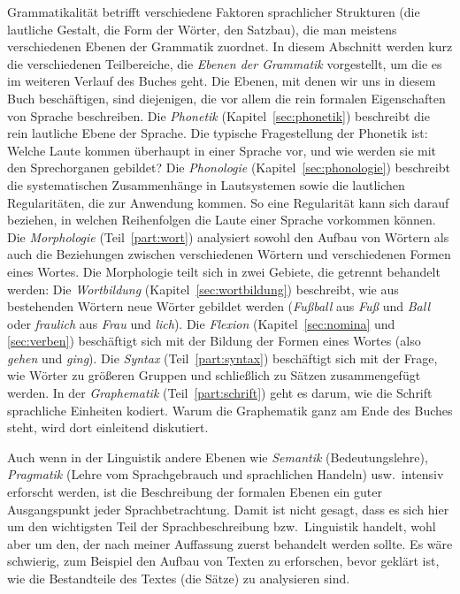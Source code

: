\label{sec:grebenen}


Grammatikalität betrifft verschiedene Faktoren sprachlicher Strukturen (\zB die lautliche Gestalt, die Form der Wörter, den Satzbau), die man meistens verschiedenen Ebenen der Grammatik zuordnet.
In diesem Abschnitt werden kurz die verschiedenen Teilbereiche, die \textit{Ebenen der Grammatik} vorgestellt, um die es im weiteren Verlauf des Buches geht.
Die Ebenen, mit denen wir uns in diesem Buch beschäftigen, sind diejenigen, die vor allem die rein formalen Eigenschaften von Sprache beschreiben.
Die \textit{Phonetik} (Kapitel~\ref{sec:phonetik}) beschreibt die rein lautliche Ebene der Sprache.
Die typische Fragestellung der Phonetik ist:
Welche Laute kommen überhaupt in einer Sprache vor, und wie werden sie mit den Sprechorganen gebildet?
Die \textit{Phonologie} (Kapitel~\ref{sec:phonologie}) beschreibt die systematischen Zusammenhänge in Lautsystemen sowie die lautlichen Regularitäten, die zur Anwendung kommen.
So eine Regularität kann sich \zB darauf beziehen, in welchen Reihenfolgen die Laute einer Sprache vorkommen können.
Die \textit{Morphologie} (Teil~\ref{part:wort}) analysiert sowohl den Aufbau von Wörtern als auch die Beziehungen zwischen verschiedenen Wörtern und verschiedenen Formen eines Wortes.
Die Morphologie teilt sich in zwei Gebiete, die getrennt behandelt werden:
Die \textit{Wortbildung} (Kapitel~\ref{sec:wortbildung}) beschreibt, wie aus bestehenden Wörtern neue Wörter gebildet werden (\zB \textit{Fußball} aus \textit{Fuß} und \textit{Ball} oder \textit{fraulich} aus \textit{Frau} und \textit{lich}).
Die \textit{Flexion} (Kapitel~\ref{sec:nomina} und \ref{sec:verben}) beschäftigt sich mit der Bildung der Formen eines Wortes (also \zB \textit{gehen} und \textit{ging}). 
Die \textit{Syntax} (Teil~\ref{part:syntax}) beschäftigt sich mit der Frage, wie Wörter zu größeren Gruppen und schließlich zu Sätzen zusammengefügt werden.
In der \textit{Graphematik} (Teil~\ref{part:schrift}) geht es darum, wie die Schrift sprachliche Einheiten kodiert.
Warum die Graphematik ganz am Ende des Buches steht, wird dort einleitend diskutiert.

Auch wenn in der Linguistik andere Ebenen wie \textit{Semantik} (Bedeutungslehre), \textit{Pragmatik} (Lehre vom Sprachgebrauch und sprachlichen Handeln) usw.\ intensiv erforscht werden, ist die Beschreibung der formalen Ebenen ein guter Ausgangspunkt jeder Sprachbetrachtung.
Damit ist nicht gesagt, dass es sich hier um den wichtigsten Teil der Sprachbeschreibung bzw.\ Linguistik handelt, wohl aber um den, der nach meiner Auffassung zuerst behandelt werden sollte.
Es wäre schwierig, zum Beispiel den Aufbau von Texten zu erforschen, bevor geklärt ist, wie die Bestandteile des Textes (die Sätze) zu analysieren sind.

